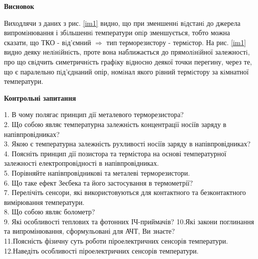 \documentclass[a4paper,14pt]{extreport}
\begin{document}
\begin{center}
\textbf{Висновок}
\end{center}

Виходлячи з даних з рис. \ref{im1} видно, що при зменшеннi вiдстанi до джерела випромiнювання і збiльшеннi температури опiр зменшується, тобто можна сказати, що ТКО - вiд’ємний $\Rightarrow$ тип терморезистору - термiстор. 
На рис. \ref{im1} видно деяку нелiнiйнiсть,
проте вона наближається до прямолiнiйної залежностi, про що свiдчить симетричнiсть графiку вiдносно деякої точки перегину, через те, що є паралельно пiд’єднаний опір, номiнал якого рiвний термiстору за кiмнатної температури.

\newpage
\begin{center}
\textbf{Контрольні запитання}
\end{center}

1. В чому полягає принцип дії металевого терморезистора?\\
2. Що собою являє температурна залежність концентрації носіїв заряду в
напівпровідниках?\\
3. Якою є температурна залежність рухливості носіїв заряду в
напівпровідниках?\\
4. Поясніть принцип дії позистора та термістора на основі температурної
залежності електропровідності в напівпровідниках.\\
5. Порівняйте напівпровідникові та металеві терморезистори.\\
6. Що таке ефект Зеєбека та його застосування в термометрії?\\
7. Перелічіть сенсори, які використовуються для контактного та
безконтактного вимірювання температури.\\
8. Що собою являє болометр?\\
9. Які особливості теплових та фотонних ІЧ-приймачів?
10.Які закони поглинання та випромінювання, сформульовані для АЧТ, Ви
знаєте?\\
11.Поясність фізичну суть роботи піроелектричних сенсорів температури.\\
12.Наведіть особливості піроелектричних сенсорів температури.\\
\end{document}
